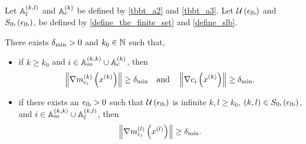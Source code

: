 \begin{lemma}
\label{norm_of_active_constraints_bounded_below}
Let $\Alk$ and $\Ack$ be defined by \cref{tbbt_a2} and \cref{tbbt_a3}.
Let $\ulb$ and $\slb$, be defined by \cref{define_the_finite_set} and \cref{define_slb}.



There exists $\deltalb > 0$ and $k_0 \in \naturals$ such that,
\begin{itemize}
\item if $k \ge k_0$ and $i \in \Amk \cup \Ack$, then
\begin{align*}
\left\|\gmcik\right\| \ge \deltalb \quad \textrm{and} \quad
\left\|\nabla c_i\left(\xk\right) \right\| \ge \deltalb.
\end{align*}
\item if there exists an $\elb > 0$ such that $\ulb$ is infinite
$k, l \ge k_0$, $(k, l) \in \slb$, and $i \in \Amk \cup \Alk$, then
\begin{align*}
\left\|\gmcil\right\| \ge \deltalb.
\end{align*}
\end{itemize}
\end{lemma}
